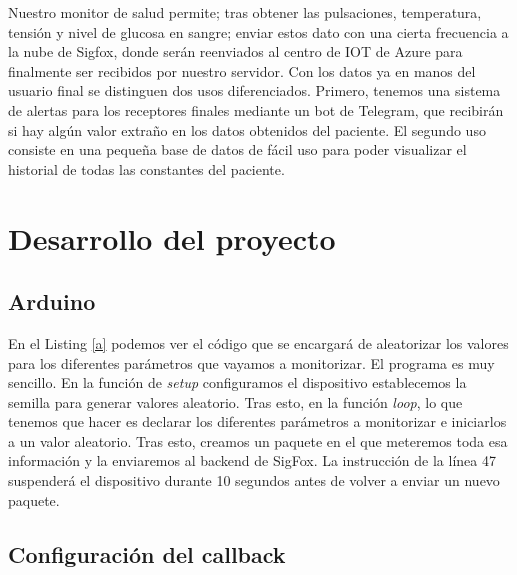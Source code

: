 \documentclass[12pt,a4paper]{article}
\begin{document}
Nuestro monitor de salud permite; tras obtener las pulsaciones, temperatura, tensión y nivel de glucosa en sangre; enviar estos dato con una cierta frecuencia a la nube de Sigfox, donde serán reenviados al centro de IOT de Azure para finalmente ser recibidos por nuestro servidor. Con los datos ya en manos del usuario final se distinguen dos usos diferenciados. Primero, tenemos una sistema de alertas para los receptores finales mediante un bot de Telegram, que recibirán si hay algún valor extraño en los datos obtenidos del paciente. El segundo uso consiste en una pequeña base de datos de fácil uso para poder visualizar el historial de todas las constantes del paciente.

\section{Desarrollo del proyecto}

\subsection{Arduino}

En el Listing \ref{a} podemos ver el código que se encargará de aleatorizar los valores para los diferentes parámetros que vayamos a monitorizar. El programa es muy sencillo. En la función de \textit{setup} configuramos el dispositivo establecemos la semilla para generar valores aleatorio. Tras esto, en la función \textit{loop}, lo que tenemos que hacer es declarar los diferentes parámetros a monitorizar e iniciarlos a un valor aleatorio. Tras esto, creamos un paquete en el que meteremos toda esa información y la enviaremos al backend de SigFox. La instrucción de la línea 47 suspenderá el dispositivo durante 10 segundos antes de volver a enviar un nuevo paquete.

\lstset{inputencoding=utf8/latin1}
\begin{minipage}{\linewidth} 
   
\end{minipage}

\subsection{Configuración del callback}
\end{document}

